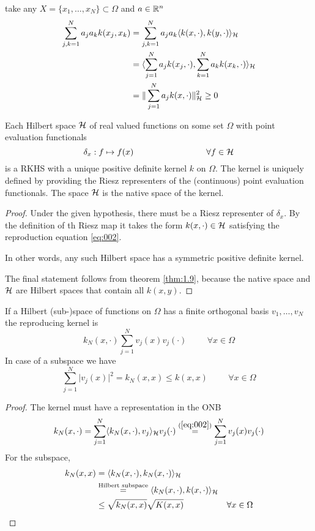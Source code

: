 take any $X=\{x_1,\dots,x_N\}\subset\Omega$ and $a\in\mathbb{R}^n$
\begin{align*}
    \sum_{j,k=1}^N a_j a_k k(x_j,x_k)&=\sum_{j,k=1}^N a_ja_k\langle k(x,\cdot),k(y,\cdot)\rangle_{\mathcal{H}}\\
    &=\langle \sum_{j=1}^N a_jk(x_j,\cdot),\sum_{k=1}^N a_k k(x_k,\cdot)\rangle_{\mathcal{H}}  \\
    &=\Vert \sum_{j=1}^N a_j k(x,\cdot)\Vert_{\mathcal{H}}^2\geq 0
\end{align*}

\begin{theorem}\label{thm:1.11}
    Each Hilbert space $\mathcal{H}$ of real valued functions on some set $\Omega$ with point evaluation functionals 
    \[\delta_x:f\mapsto f(x)\hspace{3cm}\forall f\in\cH\]
    is a  RKHS with a unique positive definite kernel $k$ on $\Omega$. The kernel is 
    uniquely defined by providing the Riesz representers of the (continuous) point evaluation functionals. The space $\mathcal{H}$ is the 
    native space of the kernel.
\end{theorem}

\begin{proof}
    Under the given hypothesis, there must be a Riesz representer of $\delta_x$. By the definition of th Riesz map 
    it takes the form $k(x,\cdot)\in\mathcal{H}$ satisfying the reproduction equation \ref{eq:002}.
    
    In other words, any such Hilbert space has a symmetric positive definite kernel.

    The final statement follows from theorem \ref{thm:1.9}, because the native space and $\mathcal{H}$ are Hilbert spaces 
    that contain all $k(x,y)$.
\end{proof}

\begin{theorem}\label{thm:1.12}
    If a Hilbert (sub-)space of functions on $\Omega$ has a finite orthogonal basis
    $v_1,\dots,v_N$ the reproducing kernel is 
    \[k_N(x,\cdot)\sum_{j=1}^N v_j(x)v_j(\cdot)\hspace{1cm} \forall x\in\Omega\]
    In case of a subspace we have 
    \[\sum_{j=1}^N \vert v_j(x)\vert^2=k_N(x,x)\leq k(x,x)\hspace{1cm}\forall x\in\Omega\] 
\end{theorem}

\begin{proof}
    The kernel must have a representation in the ONB 
    \[k_N(x,\cdot)=\sum_{j=1}^N\langle k_N(x,\cdot),v_j\rangle_{\mathcal{H}} v_j(\cdot)\stackrel{(\ref{eq:002})}{=}\sum_{j=1}^N v_j(x)v_j(\cdot)\]    
    For the subspace, %
    \begin{align*}
        k_N(x,x)&=\langle k_N(x,\cdot),k_N(x,\cdot)\rangle_{\mathcal{H}}&\\
        &\stackrel{\text{Hilbert subspace}}{=}\langle k_N(x,\cdot),k(x,\cdot)\rangle_{\mathcal{H}}&\\
        &\leq\sqrt{k_N(x,x)}\sqrt{K(x,x)}&\forall x\in\Omega
    \end{align*}
\end{proof}

